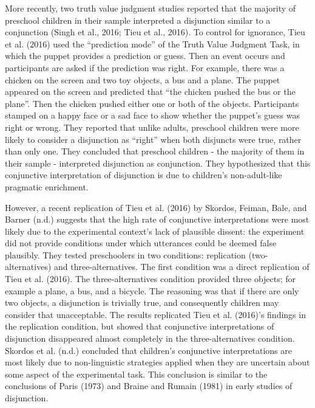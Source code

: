 \documentclass[,man,floatsintext]{apa6}
\begin{document}
More recently, two truth value judgment studies reported that the majority of preschool children in their sample interpreted a disjunction similar to a conjunction (Singh et al., 2016; Tieu et al., 2016). To control for ignorance, Tieu et al. (2016) used the \enquote{prediction mode} of the Truth Value Judgment Task, in which the puppet provides a prediction or guess. Then an event occurs and participants are asked if the prediction was right. For example, there was a chicken on the screen and two toy objects, a bus and a plane. The puppet appeared on the screen and predicted that \enquote{the chicken pushed the bus or the plane}. Then the chicken pushed either one or both of the objects. Participants stamped on a happy face or a sad face to show whether the puppet's guess was right or wrong. They reported that unlike adults, preschool children were more likely to consider a disjunction as \enquote{right} when both disjuncts were true, rather than only one. They concluded that preschool children - the majority of them in their sample - interpreted disjunction as conjunction. They hypothesized that this conjunctive interpretation of disjunction is due to children's non-adult-like pragmatic enrichment.

However, a recent replication of Tieu et al. (2016) by Skordos, Feiman, Bale, and Barner (n.d.) suggests that the high rate of conjunctive interpretations were most likely due to the experimental context's lack of plausible dissent: the experiment did not provide conditions under which utterances could be deemed false plausibly. They tested preschoolers in two conditions: replication (two-alternatives) and three-alternatives. The first condition was a direct replication of Tieu et al. (2016). The three-alternatives condition provided three objects; for example a plane, a bus, and a bicycle. The reasoning was that if there are only two objects, a disjunction is trivially true, and consequently children may consider that unacceptable. The results replicated Tieu et al. (2016)'s findings in the replication condition, but showed that conjunctive interpretations of disjunction disappeared almost completely in the three-alternatives condition. Skordos et al. (n.d.) concluded that children's conjunctive interpretations are most likely due to non-linguistic strategies applied when they are uncertain about some aspect of the experimental task. This conclusion is similar to the conclusions of Paris (1973) and Braine and Rumain (1981) in early studies of disjunction.
\end{document}
